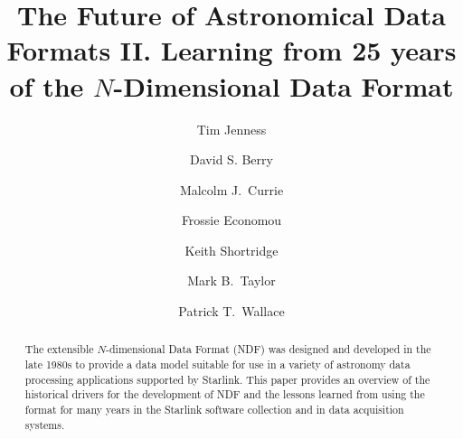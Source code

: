 \documentclass[final,authoryear,5p,times,twocolumn]{elsarticle}
\begin{document}
\begin{frontmatter}



\title{The Future of Astronomical Data Formats II. Learning from 25
  years of the $N$-Dimensional Data Format}


\author[cornell]{Tim Jenness}
\author[jac]{David S. Berry}
\author[jac]{Malcolm J.\ Currie}
\author[noao]{Frossie Economou}
\author[aao]{Keith Shortridge}
\author[bristol]{Mark B.\ Taylor}
\author[ral]{Patrick T.\ Wallace}


\address[cornell]{Department of Astronomy, Cornell University, Ithaca,
  NY 14853, USA}
\address[jac]{Joint Astronomy Centre, 660 N.\ A`oh\=ok\=u Place, Hilo, HI
  96720, USA}
\address[noao]{National Optical Astronomy
  Observatory, 950 N Cherry Ave, Tucson, AZ 85719, USA}
\address[aao]{Australian Astronomical Observatory, 105 Delhi Rd, North
Ryde, NSW 2113, Australia}
\address[bristol]{H.\ H.\ Wills Physics Laboratory, Bristol University, Tyndall Avenue, Bristol, UK}
\address[ral]{Space Science and Technology Department, STFC Rutherford Appleton Laboratory, Harwell Oxford, Didcot, Oxfordshire, OX11 0QX, UK}

\begin{abstract}

The extensible $N$-dimensional Data Format (NDF) was designed and
developed in the late 1980s to provide a data model suitable for use
in a variety of astronomy data processing applications supported by
Starlink. This paper provides an overview of the historical drivers
for the development of NDF and the lessons learned from using the
format for many years in the Starlink software collection and in data
acquisition systems.


\end{abstract}
\end{frontmatter}
\end{document}
